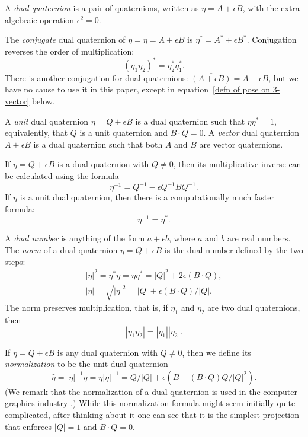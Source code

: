\documentclass[reqno,12pt]{amsart}
\begin{document}
A \emph{dual quaternion} is a pair of quaternions, written as $\eta = A + \epsilon B$, with the extra algebraic operation $\epsilon^2 = 0$.

The \emph{conjugate} dual quaternion of $\eta = \eta = A + \epsilon B$ is $\eta^* = A^* + \epsilon B^*$.  Conjugation reverses the order of multiplication:
\begin{equation}
(\eta_1\eta_2)^* = \eta_2^* \eta_1^* .
\end{equation}
There is another conjugation for dual quaternions: $\overline{(A + \epsilon B)} = A - \epsilon B$, but we have no cause to use it in this paper, except in equation~\eqref{defn of pose on 3-vector} below.

A \emph{unit} dual quaternion $\eta = Q + \epsilon B$ is a dual quaternion such that $\eta\eta^* = 1$, equivalently, that $Q$ is a unit quaternion and $B \cdot Q = 0$.  A \emph{vector} dual quaternion $A + \epsilon B$ is a dual quaternion such that both $A$ and $B$ are vector quaternions.

If $\eta = Q + \epsilon B$ is a dual quaternion with $Q \ne 0$, then its multiplicative inverse can be calculated using the formula
\begin{equation}
\eta^{-1} = Q^{-1} - \epsilon Q^{-1} B Q^{-1}.
\end{equation}
If $\eta$ is a unit dual quaternion, then there is a computationally much faster formula:
\begin{equation}
\label{inverse unit}
\eta^{-1} = \eta^*.
\end{equation}

A \emph{dual number} is anything of the form $a + \epsilon b$, where $a$ and $b$ are real numbers.  The \emph{norm} of a dual quaternion $\eta = Q + \epsilon B$ is the dual number defined by the two steps:
\begin{gather}
|\eta|^2 = \eta^* \eta = \eta \eta^* = |Q|^2 + 2 \epsilon (B \cdot Q) ,\\
\label{norm}
|\eta| = \sqrt{|\eta|^2} = |Q| + \epsilon (B \cdot Q) / |Q| .
\end{gather}
The norm preserves multiplication, that is, if $\eta_1$ and $\eta_2$ are two dual quaternions, then
\begin{equation}
\label{norm mult}
|\eta_1 \eta_2| = |\eta_1| |\eta_2| .
\end{equation}

If $\eta = Q + \epsilon B$ is any dual quaternion with $Q \ne 0$, then we define its \emph{normalization} to be the unit dual quaternion
\begin{equation}
\label{normalize}
\widehat \eta = |\eta|^{-1}\eta = \eta|\eta|^{-1}
= Q/|Q| + \epsilon (B - (B\cdot Q) Q/|Q|^2) .
\end{equation}
(We remark that the normalization of a dual quaternion is used in the computer graphics industry \cite{kavan-et-al, kavan-et-al-2}.)  While this normalization formula might seem initially quite complicated, after thinking about it one can see that it is the simplest projection that enforces $|Q| = 1$ and $B\cdot Q = 0$.
\end{document}
